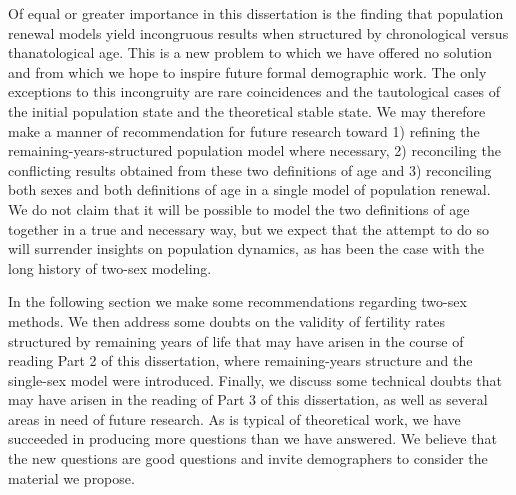 Of equal or greater importance in this dissertation is the finding that
population renewal models yield incongruous results when structured by
chronological versus thanatological age. This is a new problem to 
which we have offered no solution and from which we hope to inspire future
formal demographic work. The only exceptions to this incongruity are rare
coincidences and the tautological cases of the initial population state and 
the theoretical stable state. We may therefore make a manner of recommendation for
future research toward 1) refining the remaining-years-structured population
model where necessary, 2) reconciling the conflicting results obtained from
these two definitions of age and 3) reconciling both sexes and both
definitions of age in a single model of population renewal. We do not claim that
it will be possible to model the two definitions of age together in a true and
necessary way, but we expect that the attempt to do so will surrender insights
on population dynamics, as has been the case with the long history of two-sex
modeling.

In the following section we make some recommendations regarding two-sex methods.
We then address some doubts on the validity of fertility rates structured by
remaining years of life that may have arisen in the course of reading Part 2 of
this dissertation, where remaining-years structure and the
single-sex model were introduced. Finally, we discuss some technical doubts that
may have arisen in the reading of Part 3 of this dissertation, as well as
several areas in need of future research. As is typical of theoretical work, we
have succeeded in producing more questions than we have answered. We believe
that the new questions are good questions and invite demographers to consider the
material we propose.

